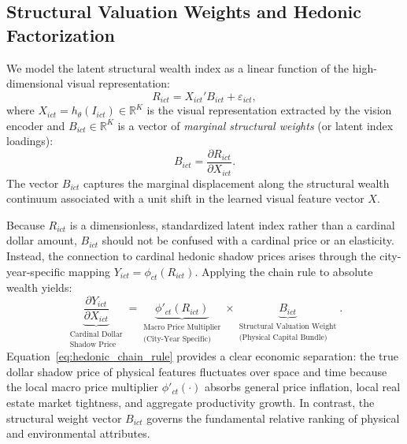 \subsection{Structural Valuation Weights and Hedonic Factorization}

We model the latent structural wealth index as a linear function of the high-dimensional visual representation:
\begin{equation}
R_{ict} = X_{ict}' B_{ict} + \varepsilon_{ict},
\label{eq:latent_linear_model}
\end{equation}
where $X_{ict} = h_\theta(I_{ict}) \in \mathbb{R}^K$ is the visual representation extracted by the vision encoder and $B_{ict} \in \mathbb{R}^K$ is a vector of \emph{marginal structural weights} (or latent index loadings):
\begin{equation}
B_{ict} = \frac{\partial R_{ict}}{\partial X_{ict}}.
\end{equation}
The vector $B_{ict}$ captures the marginal displacement along the structural wealth continuum associated with a unit shift in the learned visual feature vector $X$. 

Because $R_{ict}$ is a dimensionless, standardized latent index rather than a cardinal dollar amount, $B_{ict}$ should not be confused with a cardinal price or an elasticity. Instead, the connection to cardinal hedonic shadow prices arises through the city-year-specific mapping $Y_{ict} = \phi_{ct}(R_{ict})$. Applying the chain rule to absolute wealth yields:
\begin{equation}
\underbrace{\frac{\partial Y_{ict}}{\partial X_{ict}}}_{\substack{\text{Cardinal Dollar} \\ \text{Shadow Price}}} 
= 
\underbrace{\phi'_{ct}(R_{ict})}_{\substack{\text{Macro Price Multiplier} \\ \text{(City-Year Specific)}}} 
\times 
\underbrace{B_{ict}}_{\substack{\text{Structural Valuation Weight} \\ \text{(Physical Capital Bundle)}}}.
\label{eq:hedonic_chain_rule}
\end{equation}
Equation~\eqref{eq:hedonic_chain_rule} provides a clear economic separation: the true dollar shadow price of physical features fluctuates over space and time because the local macro price multiplier $\phi'_{ct}(\cdot)$ absorbs general price inflation, local real estate market tightness, and aggregate productivity growth. In contrast, the structural weight vector $B_{ict}$ governs the fundamental relative ranking of physical and environmental attributes.

